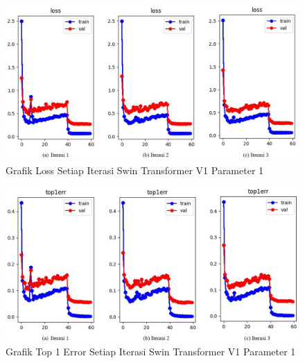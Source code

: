 
\begin{figure}[ht]
  \centering
  \includegraphics[scale=0.55]{gambar/Train SwinV1 Loss.png}
  \caption{Grafik Loss Setiap Iterasi Swin Transformer V1 Parameter 1}
  \label{fig:grafiklossdantop1errdariswinv1parameter1iterasi1}
\end{figure}

\begin{figure}[ht]
  \centering
  \includegraphics[scale=0.55]{gambar/Train SwinV1 Top1Err.png}
  \caption{Grafik Top 1 Error Setiap Iterasi Swin Transformer V1 Parameter 1}
  \label{fig:grafiklossdantop1errdariswinv1parameter1iterasi2}
\end{figure}


